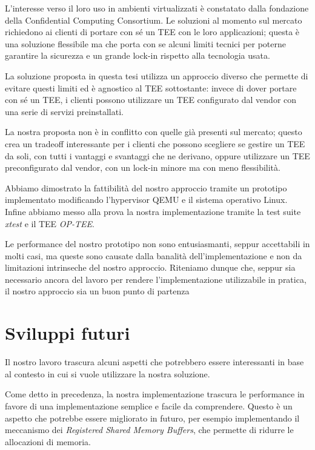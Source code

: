\documentclass[12pt,italian]{report}
\begin{document}
L'interesse verso il loro uso in ambienti virtualizzati è constatato dalla
fondazione della Confidential Computing Consortium.
Le soluzioni al momento sul mercato richiedono ai clienti di portare con sé
un TEE con le loro applicazioni; questa è una soluzione flessibile ma che
porta con se alcuni limiti tecnici per poterne garantire la sicurezza
e un grande lock-in rispetto alla tecnologia usata.

La soluzione proposta in questa tesi utilizza un approccio diverso che
permette di evitare questi limiti ed è agnostico al TEE sottostante:
invece di dover portare con sé un TEE, i clienti possono utilizzare un TEE
configurato dal vendor con una serie di servizi preinstallati.

La nostra proposta non è in conflitto con quelle già presenti sul mercato;
questo crea un tradeoff interessante per i clienti che possono scegliere
se gestire un TEE da soli, con tutti i vantaggi e svantaggi che ne derivano,
oppure utilizzare un TEE preconfigurato dal vendor, con un lock-in minore
ma con meno flessibilità.

Abbiamo dimostrato la fattibilità del nostro approccio tramite un prototipo
implementato modificando l'hypervisor QEMU e il sistema operativo Linux.
Infine abbiamo messo alla prova la nostra implementazione tramite la test
suite \textit{xtest} e il TEE \textit{OP-TEE}.

Le performance del nostro prototipo non sono entusiasmanti, seppur accettabili
in molti casi, ma queste sono causate dalla banalità dell'implementazione e
non da limitazioni intrinseche del nostro approccio.
Riteniamo dunque che, seppur sia necessario ancora del lavoro per rendere
l'implementazione utilizzabile in pratica, il nostro approccio sia un buon
punto di partenza

\section{Sviluppi futuri}
\label{sec:sviluppi-futuri}
Il nostro lavoro trascura alcuni aspetti che potrebbero essere interessanti
in base al contesto in cui si vuole utilizzare la nostra soluzione.

Come detto in precedenza, la nostra implementazione trascura le performance in
favore di una implementazione semplice e facile da comprendere.
Questo è un aspetto che potrebbe essere migliorato in futuro, per esempio
implementando il meccanismo dei \textit{Registered Shared Memory Buffers},
che permette di ridurre le allocazioni di memoria.
\end{document}
